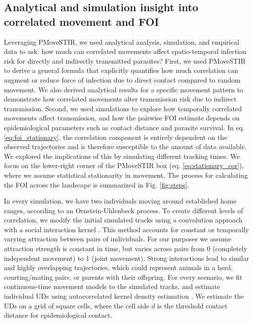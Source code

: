 \documentclass[letterpaper]{article}
\begin{document}
\subsection*{Analytical and simulation insight into correlated movement and FOI}

Leveraging PMoveSTIR, we used analytical analysis, simulation, and empirical data to ask: how much can correlated movements affect spatio-temporal infection risk for directly and indirectly transmitted parasites? 
First, we used PMoveSTIR to derive a general formula that explicitly quantifies how much correlation can augment or reduce force of infection due to direct contact compared to random movement. We also derived analytical results for a specific movement pattern to demonstrate how correlated movements alter transmission risk due to indirect transmission.
Second, we used simulations to explore how temporally correlated movements affect  transmission, and how the pairwise FOI estimate depends on epidemiological parameters such as contact distance and parasite survival. In eq.\ref{eq:foi_stationary}, the correlation component is entirely dependent on the observed trajectories and is therefore susceptible to the amount of data available. We explored the implications of this by simulating different tracking times. We focus on the lower-right corner of the PMoveSTIR box (eq. \ref{eq:stationary_cor}), where we assume statistical stationarity in movement. The process for calculating the FOI across the landscape is summarized in Fig. \ref{fig:steps}.

In every simulation, we have two individuals moving around established home ranges, according to an Ornstein-Uhlenbeck process. To create different levels of correlation, we modify the initial simulated tracks using a convolution approach with a social interaction kernel \citep{Scharf2018}. This method accounts for constant or temporally varying attraction between pairs of individuals. For our purposes we assume attraction strength is constant in time, but varies across pairs from 0 (completely independent movement) to 1 (joint movement). Strong interactions lead to similar and highly overlapping trajectories, which could represent animals in a herd, courting/mating pairs, or parents with their offspring.
For every scenario, we fit continuous-time movement models to the simulated tracks, and estimate individual UDs using autocorrelated kernel density estimation \citep{Calabrese2016}. We estimate the UDs on a grid of square cells, where the cell side $d$ is the threshold contact distance for epidemiological contact. 
\end{document}
